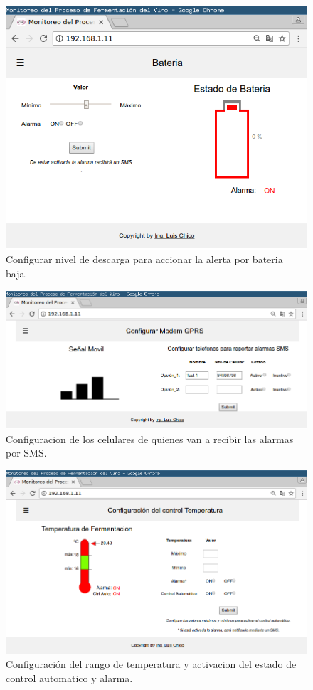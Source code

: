 \begin{figure}[h]
  \centering
  \includegraphics[scale=.25]{./Figures/config_bat.png}
  \caption{Configurar nivel de descarga para accionar la alerta por bateria baja.}
  \label{fig:web_bat}
\end{figure}
\begin{figure}[h]
  \centering
  \includegraphics[scale=.25]{./Figures/config_Modem.png}
  \caption{Configuracion de los celulares de quienes van a recibir las alarmas por SMS.}
  \label{fig:web_Modem}
\end{figure}
\begin{figure}[h]
  \centering
  \includegraphics[scale=.25]{./Figures/config_temp.png}
  \caption{Configuración del rango de temperatura y activacion del estado de control automatico y alarma.}
  \label{fig:web_temp}
\end{figure}


